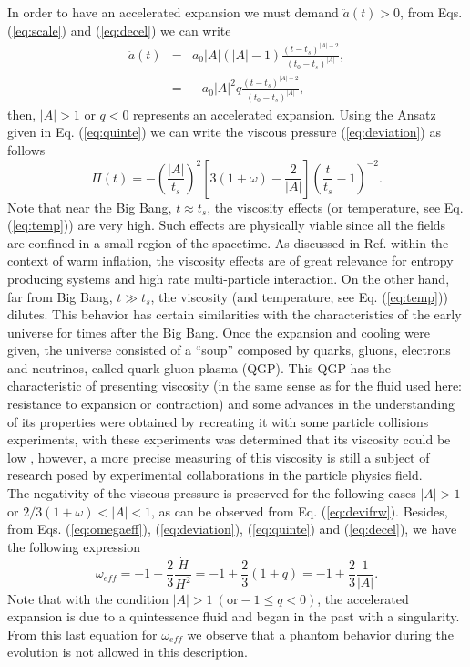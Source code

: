 \documentclass[twocolumn,showpacs,nofootinbib,floats,amsmath,amssymb]{revtex4}
\begin{document}
In order to have an accelerated expansion we must demand $\ddot{a}(t) > 0$, from Eqs. (\ref{eq:scale}) and (\ref{eq:decel}) we can write
\begin{eqnarray}
\ddot{a}(t) &=& a_{0}\left| A\right| \left(\left| A\right| - 1\right)\frac{\left(t-t_{s}\right)^{\left| A\right|-2}}{(t_{0}-t_{s})^{\left| A\right|}}, \label{eq:accel}\\ 
&=& -a_{0}\left| A\right|^{2}q\frac{\left(t-t_{s}\right)^{\left| A\right|-2}}{(t_{0}-t_{s})^{\left| A \right|}},
\end{eqnarray}  
then, $\left| A\right| > 1$ or $q < 0$ represents an accelerated expansion. Using the Ansatz given in Eq. (\ref{eq:quinte}) we can write the viscous pressure (\ref{eq:deviation}) as follows
\begin{equation}
\Pi(t) = -\left(\frac{\left|A\right|}{t_{s}}\right)^{2}\left[3(1+\omega)-\frac{2}{\left|A\right|}\right]\left(\frac{t}{t_{s}}-1 \right)^{-2}.
\label{eq:devifrw}
\end{equation}
Note that near the Big Bang, $t \approx t_{s}$, the viscosity effects (or temperature, see Eq. (\ref{eq:temp})) are very high. Such effects are physically viable since all the fields are confined in a small region of the spacetime. As discussed in Ref. \cite{SdC} within the context of warm inflation, the viscosity effects are of great relevance for entropy producing systems and high rate multi-particle interaction. On the other hand, far from Big Bang, $t \gg t_{s}$, the viscosity (and temperature, see Eq. (\ref{eq:temp})) dilutes. This behavior has certain similarities with the characteristics of the early universe for times after the Big Bang. Once the expansion and cooling were given, the universe consisted of a ``soup'' composed by quarks, gluons, electrons and neutrinos, called quark-gluon plasma (QGP). This QGP has the characteristic of presenting viscosity (in the same sense as for the fluid used here: resistance to expansion or contraction) and some advances in the understanding of its properties were obtained by recreating it with some particle collisions experiments, with these experiments was determined that its viscosity could be low \cite{qgp}, however, a more precise measuring of this viscosity is still a subject of research posed by experimental collaborations in the particle physics field.\\ 

The negativity of the viscous pressure is preserved for the following cases $\left|A\right| > 1$ or $2/3(1+\omega) < \left|A\right| < 1$, as can be observed from Eq. (\ref{eq:devifrw}). Besides, from Eqs. (\ref{eq:omegaeff}), (\ref{eq:deviation}), (\ref{eq:quinte}) and (\ref{eq:decel}), we have the following expression 
\begin{equation}
\omega_{eff} = -1-\frac{2}{3}\frac{\dot{H}}{H^{2}} = -1+\frac{2}{3}(1+q) = -1+\frac{2}{3}\frac{1}{\left|A\right|}.
\label{eq:effective}
\end{equation}
Note that with the condition $\left|A\right| > 1 \ (\mbox{or} - 1 \leq q < 0 )$, the accelerated expansion is due to a quintessence fluid and began in the past with a singularity. From this last equation  for $\omega_{eff}$ we observe that a phantom behavior during the evolution is not allowed in this description.
\end{document}
